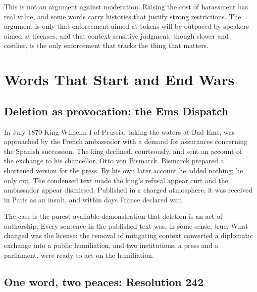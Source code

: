 \documentclass[11pt,a4paper]{article}
\theoremstyle{plain}
\theoremstyle{definition}
\theoremstyle{remark}
\begin{document}
\begin{caution}
This is not an argument against moderation. Raising the cost of harassment has real value, and some words carry histories that justify strong restrictions. The argument is only that enforcement aimed at tokens will be outpaced by speakers aimed at licenses, and that context-sensitive judgment, though slower and costlier, is the only enforcement that tracks the thing that matters.
\end{caution}
\section{Words That Start and End Wars}

\subsection{Deletion as provocation: the Ems Dispatch}

In July 1870 King Wilhelm I of Prussia, taking the waters at Bad Ems, was approached by the French ambassador with a demand for assurances concerning the Spanish succession. The king declined, courteously, and sent an account of the exchange to his chancellor, Otto von Bismarck. Bismarck prepared a shortened version for the press. By his own later account he added nothing; he only cut. The condensed text made the king's refusal appear curt and the ambassador appear dismissed. Published in a charged atmosphere, it was received in Paris as an insult, and within days France declared war.

The case is the purest available demonstration that deletion is an act of authorship. Every sentence in the published text was, in some sense, true. What changed was the license: the removal of mitigating context converted a diplomatic exchange into a public humiliation, and two institutions, a press and a parliament, were ready to act on the humiliation.

\subsection{One word, two peaces: Resolution 242}
\end{document}
